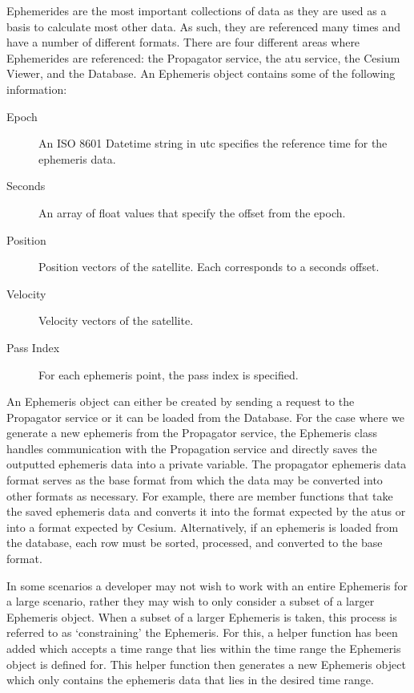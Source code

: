 Ephemerides are the most important collections of data as they are used as a
basis to calculate most other data. As such, they are referenced many times and
have a number of different formats. There are four different areas where
Ephemerides are referenced: the Propagator service, the \gls{atu} service, the
Cesium Viewer, and the Database. An Ephemeris object contains some of the
following information:

\begin{description}

    \item[Epoch] An ISO 8601 Datetime string in \gls{utc} specifies the
	reference time for the ephemeris data.

    \item[Seconds] An array of float values that specify the offset from the
	epoch.

    \item[Position] Position vectors of the satellite. Each corresponds to a
	seconds offset.

    \item[Velocity] Velocity vectors of the satellite. 

    \item[Pass Index] For each ephemeris point, the pass index is specified. 

\end{description}


An Ephemeris object can either be created by sending a request to the
Propagator service or it can be loaded from the Database. For the case where we
generate a new ephemeris from the Propagator service, the Ephemeris class
handles communication with the Propagation service and directly saves the
outputted ephemeris data into a private variable. The propagator ephemeris data
format serves as the base format from which the data may be converted into
other formats as necessary.  For example, there are member functions that take
the saved ephemeris data and converts it into the format expected by the
\glspl{atu} or into a format expected by Cesium. Alternatively, if an ephemeris
is loaded from the database, each row must be sorted, processed, and converted
to the base format. 

In some scenarios a developer may not wish to work with an entire Ephemeris for
a large scenario, rather they may wish to only consider a subset of a larger
Ephemeris object. When a subset of a larger Ephemeris is taken, this process is
referred to as `constraining' the Ephemeris. For this, a helper function has
been added which accepts a time range that lies within the time range the
Ephemeris object is defined for. This helper function then generates a new
Ephemeris object which only contains the ephemeris data that lies in the
desired time range.  

